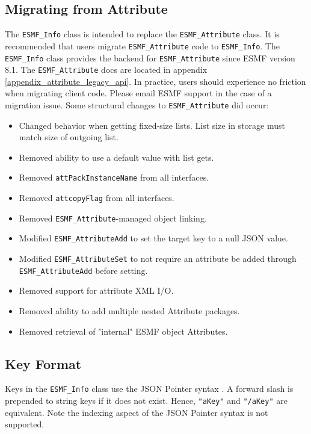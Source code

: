\subsection{Migrating from Attribute}
The \texttt{ESMF\_Info} class is intended to replace the \texttt{ESMF\_Attribute} class. It is recommended that users migrate \texttt{ESMF\_Attribute} code to \texttt{ESMF\_Info}. The \texttt{ESMF\_Info} class provides the backend for \texttt{ESMF\_Attribute} since ESMF version 8.1. The \texttt{ESMF\_Attribute} docs are located in appendix \ref{appendix_attribute_legacy_api}. In practice, users should experience no friction when migrating client code. Please email ESMF support in the case of a migration issue. Some structural changes to \texttt{ESMF\_Attribute} did occur:
\begin{itemize}
    \item Changed behavior when getting fixed-size lists. List size in storage must match size of outgoing list.
    \item Removed ability to use a default value with list gets.
    \item Removed \texttt{attPackInstanceName} from all interfaces.
    \item Removed \texttt{attcopyFlag} from all interfaces.
    \item Removed \texttt{ESMF\_Attribute}-managed object linking.
    \item Modified \texttt{ESMF\_AttributeAdd} to set the target key to a null JSON value.
    \item Modified \texttt{ESMF\_AttributeSet} to not require an attribute be added through \texttt{ESMF\_AttributeAdd} before setting.
    \item Removed support for attribute XML I/O.
    \item Removed ability to add multiple nested Attribute packages.
    \item Removed retrieval of "internal" ESMF object Attributes.
\end{itemize}

\subsection{Key Format}
\label{info_key_format}
Keys in the \texttt{ESMF\_Info} class use the JSON Pointer syntax \cite{json_for_modern_cpp_json_pointer}. A forward slash is prepended to string keys if it does not exist. Hence, \texttt{"aKey"} and \texttt{"/aKey"} are equivalent. Note the indexing aspect of the JSON Pointer syntax is not supported.